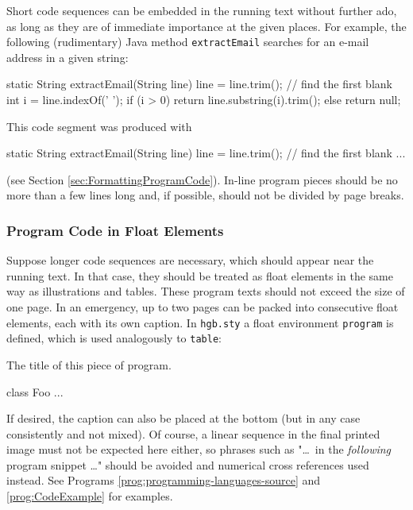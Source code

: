Short code sequences can be embedded in the running text without further ado,
as long as they are of immediate importance at the given places.
For example, the following (rudimentary) Java method \texttt{extractEmail}
searches for an e-mail address in a given string:
%
\begin{JavaCode}[numbers=none]
static String extractEmail(String line) {
    line = line.trim(); // find the first blank
    int i = line.indexOf(' ');
    if (i > 0)
    return line.substring(i).trim();
    else
    return null;
}
\end{JavaCode}
%
\noindent
This code segment was produced with
%
\begin{LaTeXCode}[numbers=none]
\begin{JavaCode}[numbers=none]
static String extractEmail(String line) {
    line = line.trim(); // find the first blank
    ...
}
\end{JavaCode}
\end{LaTeXCode}
%
(see Section \ref{sec:FormattingProgramCode}). In-line program pieces should be
no more than a few lines long and, if possible, should not be divided by page
breaks.


\subsubsection{Program Code in Float Elements}

Suppose longer code sequences are necessary, which should appear near the
running text. In that case, they should be treated as float elements in the same
way as illustrations and tables. These program texts should not exceed the size
of one page. In an emergency, up to two pages can be packed into consecutive
float elements, each with its own caption. In \texttt{hgb.sty} a float
environment \texttt{program} is defined, which is used analogously to
\texttt{table}:
%
\begin{LaTeXCode}[numbers=none]
\begin{program}
\caption{The title of this piece of program.}
\label{prog:xyz}
\begin{JavaCode}
  class Foo {
    ...
  }
\end{JavaCode}
\end{program}
\end{LaTeXCode}
%
If desired, the caption can also be placed at the bottom (but in any case
consistently and not mixed). Of course, a linear sequence in the final
printed image must not be expected here either, so phrases such as "\ldots\
in the \emph{following} program snippet \ldots" should be avoided and
numerical cross references used instead. See Programs
\ref{prog:programming-languages-source} and \ref{prog:CodeExample} for examples.


